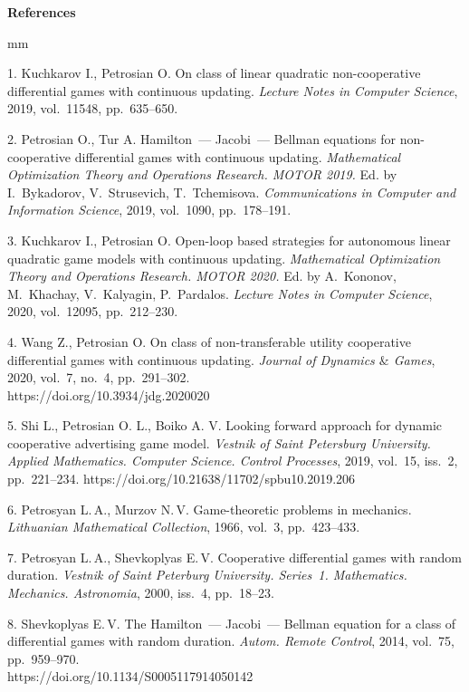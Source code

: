 

{\small



\vskip6mm

\noindent \textbf{References} }

mm

{\footnotesize



1.  Kuchkarov I.,  Petrosian O. On class of linear quadratic
non-cooperative differential games with continuous updating. {\it
Lecture Notes in Computer Science}, 2019, vol.~11548, pp.~635--650.

2.   Petrosian O.,   Tur A. Hamilton~--- Jacobi~--- Bellman equations for
non-cooperative differential games with continuous updating.
 {\it Mathematical
Optimization Theory and Ope\-rations Research. MOTOR 2019.}  Ed.  by
 I.~Bykadorov, V.~Strusevich,  T.~Tchemisova. {\it Communications in
Computer and Information Science}, 2019,  vol.~1090, pp.~178--191.

 3.
 Kuchkarov I.,  Petrosian O. Open-loop based strategies for
autonomous linear quadratic game models with continuous updating.
{\it Mathematical Optimization Theory and Operations Research. MOTOR
2020.}  Ed. by A.~Kononov, M.~Khachay, V.~Kalyagin, P.~Pardalos.
{\it Lecture Notes in Computer Science}, 2020, vol.~12095, pp.~212--230.


4.  Wang Z.,  Petrosian  O. On class of non-transferable utility
cooperative differential games with continuous updating. {\it
Journal of Dynamics $\&$ Games},  2020, vol.~7, no.~4, pp.~291--302.\\
https://doi.org/10.3934/jdg.2020020

5. Shi L., Petrosian O. L., Boiko A. V. Looking forward approach for dynamic
cooperative advertising game model. {\it Vestnik of Saint Petersburg University. Applied Mathematics.
Computer Science. Control Processes}, 2019, vol.~15, iss.~2, pp.~221--234. %
https://doi.org/10.21638/11702/spbu10.2019.206


6.  Petrosyan L.\,A.,  Murzov N.\,V.  Game-theoretic problems in
mechanics. {\it  Lithuanian Mathematical Collection}, 1966, vol.~3,
pp.~423--433.

7.  Petrosyan L.\,A.,  Shevkoplyas E.\,V.  Cooperative differential
games with random duration. {\it  Vestnik of Saint Peterburg
University. Series~1. Mathematics. Mechanics. Astronomia}, 2000,
iss.~4, pp.~18--23.

8.   Shevkoplyas  E.\,V. The Hamilton~--- Jacobi~--- Bellman equation for a class of differential games with random duration. {\it Autom. Remote
Control}, 2014, vol.~75, pp.~959--970.\\
https://doi.org/10.1134/S0005117914050142



}

